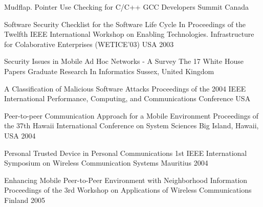 \begin{thebibliography}{9}
		{}
		{Mudflap. Pointer Use Checking for {C/C++}}
		{{GCC} Developers Summit}
		{Canada}
		{}
	
		{
			\biband
			\biband
			}
		{Software Security Checklist for the Software Life Cycle}
		{In Proceedings of the Twelfth {IEEE} International Workshop on Enabling Technologies. Infrastructure for Colaborative Enterprises ({WETICE}'03)}
		{USA}
		{2003}
	
		{
			\biband
			}
		{Security Issues in Mobile Ad Hoc Networks - A Survey}
		{The 17 White House Papers Graduate Research In Informatics}
		{Sussex, United Kingdom}
		{}
	
		{
			\biband
			}
		{A Classification of Malicious Software Attacks}
		{Proceedings of the 2004 IEEE International Performance, Computing, and Communications Conference}
		{USA}
		{}
	
		{
			\biband
			\biband
			}
		{Peer-to-peer Communication Approach for a Mobile Environment}
		{Proceedings of the 37th {H}awaii International Conference on System Sciences}
		{Big Island, Hawaii, USA}
		{2004}
	
		{
			\biband
			\biband
			\biband
			\biband
			\biband
			\biband
			}
		{Personal Trusted Device in Personal Communications}
		{1st {IEEE} International Symposium on Wireless Communication Systems}
		{Mauritius}
		{2004}
	
		{
			\biband
			}
		{Enhancing Mobile Peer-to-Peer Environment with Neighborhood Information}
		{Proceedings of the 3rd Workshop on Applications of Wireless Communications}
		{Finland}
		{2005}
	

\end{thebibliography}
